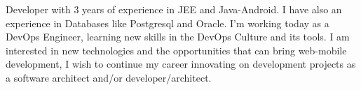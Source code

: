 %
%
%
\par{
Developer with 3 years of experience in JEE and Java-Android. I have also an experience in Databases like Postgresql and
Oracle. I'm working today as a DevOps Engineer, learning new skills in the DevOps Culture and its tools. I am interested
in new technologies and the opportunities that can bring web-mobile development, I wish to continue my career innovating
on development projects as a software architect and/or developer/architect.
}
